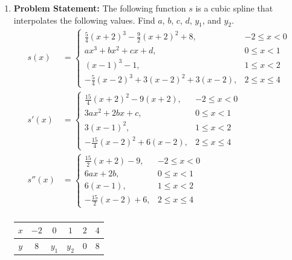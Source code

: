 \documentclass[12pt,twoside]{amsart}
\begin{document}
\begin{enumerate}
    \item\textbf{Problem Statement:} The following function $s$ is a cubic spline that interpolates the following values. Find $a$, $b$, $c$, $d$, $y_1$, and $y_2$.
    \begin{align*}
    s(x) & = \begin{cases}
        \frac{5}{4}(x + 2)^3 - \frac{9}{2}(x + 2)^2 + 8, & -2 \leq x < 0 \\
        ax^3 + bx^2 + cx + d, & 0 \leq x < 1 \\
        (x - 1)^3 - 1, & 1 \leq x < 2 \\
        -\frac{5}{4}(x - 2)^3 + 3(x - 2)^2 + 3(x - 2), & 2 \leq x \leq 4
    \end{cases} \\
    s'(x) & = \begin{cases}
        \frac{15}{4}(x + 2)^2 - 9(x + 2), & -2 \leq x < 0 \\
        3ax^2 + 2bx + c, & 0 \leq x < 1 \\
        3(x - 1)^2, & 1 \leq x < 2 \\
        -\frac{15}{4}(x - 2)^2 + 6(x - 2), & 2 \leq x \leq 4
    \end{cases} \\
    s''(x) & = \begin{cases}
        \frac{15}{2}(x + 2) - 9, & -2 \leq x < 0 \\
        6ax + 2b, & 0 \leq x < 1 \\
        6(x - 1), & 1 \leq x < 2 \\
        -\frac{15}{2}(x - 2) + 6, & 2 \leq x \leq 4
    \end{cases} \\
    \end{align*}

    \begin{center}
    \begin{tabular}{|c||c|c|c|c|c|}
    \hline
    $x$ & $-2$ & $0$ & $1$ & $2$ & $4$ \\
    \hline
    $y$ & $8$ & $y_1$ & $y_2$ & $0$ & $8$ \\
    \hline
    \end{tabular}
    \end{center}


\end{enumerate}
\end{document}
